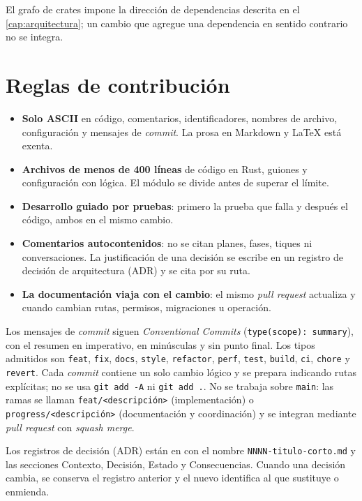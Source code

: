 El grafo de crates impone la dirección de dependencias descrita en el
\cref{cap:arquitectura}; un cambio que agregue una dependencia en sentido
contrario no se integra.

\section{Reglas de contribución}\label{sec:mant-reglas}

\begin{itemize}
  \item \textbf{Solo ASCII} en código, comentarios, identificadores, nombres
    de archivo, configuración y mensajes de \emph{commit}. La prosa en
    Markdown y \LaTeX{} está exenta.
  \item \textbf{Archivos de menos de 400 líneas} de código en Rust, guiones y
    configuración con lógica. El módulo se divide antes de superar el límite.
  \item \textbf{Desarrollo guiado por pruebas}: primero la prueba que falla y
    después el código, ambos en el mismo cambio.
  \item \textbf{Comentarios autocontenidos}: no se citan planes, fases,
    tiques ni conversaciones. La justificación de una decisión se escribe en
    un registro de decisión de arquitectura (ADR) y se cita por su ruta.
  \item \textbf{La documentación viaja con el cambio}: el mismo
    \emph{pull request} actualiza  y
     cuando cambian rutas, permisos,
    migraciones u operación.
\end{itemize}

Los mensajes de \emph{commit} siguen \emph{Conventional Commits}
(\texttt{type(scope): summary}), con el resumen en imperativo, en minúsculas
y sin punto final. Los tipos admitidos son \texttt{feat}, \texttt{fix}, \texttt{docs},
\texttt{style}, \texttt{refactor}, \texttt{perf}, \texttt{test},
\texttt{build}, \texttt{ci}, \texttt{chore} y \texttt{revert}. Cada
\emph{commit} contiene un solo cambio lógico y se prepara indicando rutas
explícitas; no se usa \texttt{git add -A} ni \texttt{git add .}. No se trabaja
sobre \texttt{main}: las ramas se llaman \texttt{feat/<descripción>}
(implementación) o \texttt{progress/<descripción>} (documentación y
coordinación) y se integran mediante \emph{pull request} con
\emph{squash merge}.

Los registros de decisión (ADR) están en  con el nombre
\texttt{NNNN-titulo-corto.md} y las secciones Contexto, Decisión, Estado y
Consecuencias. Cuando una decisión cambia, se conserva el registro anterior y
el nuevo identifica al que sustituye o enmienda.

